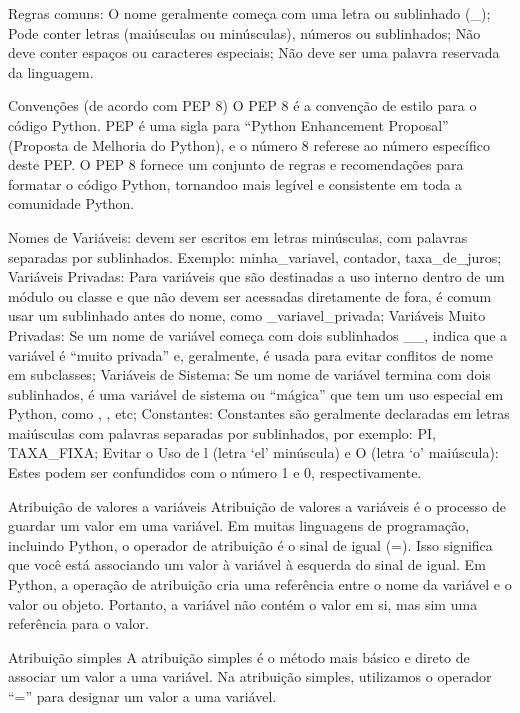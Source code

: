 \documentclass[letterpaper,10pt,english]{jupyterBook}
\begin{document}
\sphinxAtStartPar
Regras comuns:
O nome geralmente começa com uma letra ou sublinhado (\_);
Pode conter letras (maiúsculas ou minúsculas), números ou sublinhados;
Não deve conter espaços ou caracteres especiais;
Não deve ser uma palavra reservada da linguagem.

\sphinxAtStartPar
Convenções (de acordo com PEP 8)
O PEP 8 é a convenção de estilo para o código Python. PEP é uma sigla para “Python Enhancement Proposal” (Proposta de Melhoria do Python), e o número 8 refere\sphinxhyphen{}se ao número específico deste PEP. O PEP 8 fornece um conjunto de regras e recomendações para formatar o código Python, tornando\sphinxhyphen{}o mais legível e consistente em toda a comunidade Python.

\sphinxAtStartPar
Nomes de Variáveis: devem ser escritos em letras minúsculas, com palavras separadas por sublinhados. Exemplo: minha\_variavel, contador, taxa\_de\_juros;
Variáveis Privadas: Para variáveis que são destinadas a uso interno dentro de um módulo ou classe e que não devem ser acessadas diretamente de fora, é comum usar um sublinhado antes do nome, como \_variavel\_privada;
Variáveis Muito Privadas: Se um nome de variável começa com dois sublinhados \_\_, indica que a variável é “muito privada” e, geralmente, é usada para evitar conflitos de nome em subclasses;
Variáveis de Sistema: Se um nome de variável termina com dois sublinhados, é uma variável de sistema ou “mágica” que tem um uso especial em Python, como , , etc;
Constantes: Constantes são geralmente declaradas em letras maiúsculas com palavras separadas por sublinhados, por exemplo: PI, TAXA\_FIXA;
Evitar o Uso de l (letra ‘el’ minúscula) e O (letra ‘o’ maiúscula): Estes podem ser confundidos com o número 1 e 0, respectivamente.

\sphinxAtStartPar
Atribuição de valores a variáveis
Atribuição de valores a variáveis é o processo de guardar um valor em uma variável. Em muitas linguagens de programação, incluindo Python, o operador de atribuição é o sinal de igual (=). Isso significa que você está associando um valor à variável à esquerda do sinal de igual.
Em Python, a operação de atribuição cria uma referência entre o nome da variável e o valor ou objeto. Portanto, a variável não contém o valor em si, mas sim uma referência para o valor.

\sphinxAtStartPar
Atribuição simples
A atribuição simples é o método mais básico e direto de associar um valor a uma variável. Na atribuição simples, utilizamos o operador “=” para designar um valor a uma variável.
\end{document}
